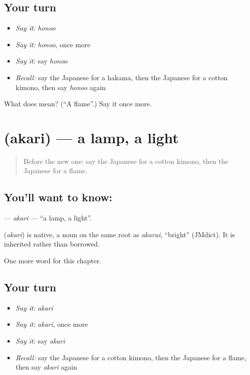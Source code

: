 \subsection*{Your turn}
\begin{itemize}
\raggedright
  \item \emph{Say it:} \emph{honoo}
  \item \emph{Say it:} \emph{honoo}, once more
  \item \emph{Say it:} say \emph{honoo}
  \item \emph{Recall:} say the Japanese for a hakama, then the Japanese for a cotton kimono, then say \emph{honoo} again
\end{itemize}

\begin{tcolorbox}[breakable,colback=teal!4,colframe=teal!35!black,title={Before you move on}]
What does  mean? (\textquotedblleft{}A flame\textquotedblright{}.) Say it once more.
\end{tcolorbox}
\section[\texorpdfstring{\ja{あかり} (akari)}{あかり (akari)}]{ (akari) — a lamp, a light}

\label{lesson:JA-C105-akari}



\begin{quote}
Before the new one: say the Japanese for a cotton kimono, then the Japanese for a flame.
\end{quote}

\subsection*{You'll want to know: }
\textbf{} — \emph{akari} — \textquotedblleft{}a lamp, a light\textquotedblright{}.

\begin{cousinweb}
\textbf{} (\emph{akari}) is native, a noun on the same root as \emph{akarui}, \textquotedblleft{}bright\textquotedblright{} (JMdict). It is inherited rather than borrowed.
\end{cousinweb}

\begin{grammarlens}[title={What you've built}]
One more word for this chapter.
\end{grammarlens}

\subsection*{Your turn}
\begin{itemize}
\raggedright
  \item \emph{Say it:} \emph{akari}
  \item \emph{Say it:} \emph{akari}, once more
  \item \emph{Say it:} say \emph{akari}
  \item \emph{Recall:} say the Japanese for a cotton kimono, then the Japanese for a flame, then say \emph{akari} again
\end{itemize}

